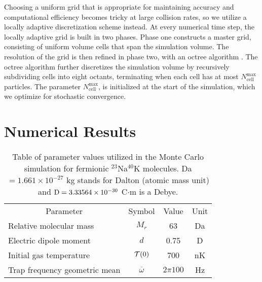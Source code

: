 \documentclass[reprint, amsmath, amssymb, aps, superscriptaddress]{revtex4-1}
\begin{document}
Choosing a uniform grid that is appropriate for maintaining accuracy and computational efficiency becomes tricky at large collision rates, so we utilize a locally adaptive discretization scheme instead. 
At every numerical time step, the locally adaptive grid is built in two phases. Phase one constructs a master grid, consisting of uniform volume cells that span the simulation volume. 
The resolution of the grid is then refined in phase two, with an octree algorithm \cite{Franklin85_Springer}. The octree algorithm further discretizes the simulation volume by recursively subdividing cells into eight octants, terminating when each cell has at most $N_{\text{cell}}^{\max}$ particles. The parameter $N_{\text{cell}}^{\max}$, is initialized at the start of the simulation, which we optimize for stochastic convergence.  

\section{ Numerical Results }


\begin{table}[ht]
\caption{ \label{tab:system_parameter} 
Table of parameter values utilized in the Monte Carlo simulation for fermionic $^{23}$Na$^{40}$K molecules. Da $= 1.661 \times 10^{-27}$ kg stands for Dalton (atomic mass unit) and ${\rm D} = 3.33564 \times 10^{-30}$ C$\cdot$m is a Debye. }
\begin{ruledtabular}
\begin{tabular}{l c c c}
    \multicolumn{1}{c}{\textrm{Parameter}} & \multicolumn{1}{c}{\textrm{Symbol}} & \multicolumn{1}{c}{\textrm{Value}} & \multicolumn{1}{c}{\textrm{Unit}} \\
    \colrule
    Relative molecular mass & $M_r$ & 63 & Da \\
    Electric dipole moment & $d$ & 0.75 & D \\
    Initial gas temperature & ${\cal T}(0)$ & 700 & nK \\
    Trap frequency geometric mean & $\overline{\omega}$ & $2 \pi 100$ & Hz 
\end{tabular}
\end{ruledtabular}
\end{table}
\end{document}
